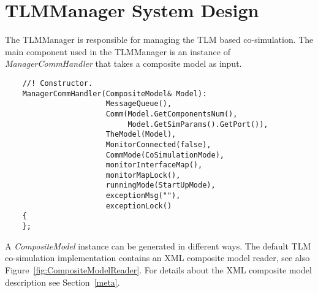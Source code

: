 \chapter{TLMManager System Design}
The TLMManager is responsible for managing the TLM based co-simulation. 
The main component used in the TLMManager is an instance of {\em ManagerCommHandler} that takes a composite model as input.
{\scriptsize
\begin{verbatim}
    //! Constructor.
    ManagerCommHandler(CompositeModel& Model):
                       MessageQueue(),
                       Comm(Model.GetComponentsNum(), 
                            Model.GetSimParams().GetPort()),
                       TheModel(Model),
                       MonitorConnected(false),
                       CommMode(CoSimulationMode),
                       monitorInterfaceMap(),
                       monitorMapLock(),
                       runningMode(StartUpMode),
                       exceptionMsg(""),
                       exceptionLock()
    {
    };
\end{verbatim}
}

A {\em CompositeModel} instance can be generated in different ways. 
The default TLM co-simulation implementation contains an XML composite model reader, see also Figure~\ref{fig:CompositeModelReader}. 
For details about the XML composite model description see Section~\ref{meta}.

